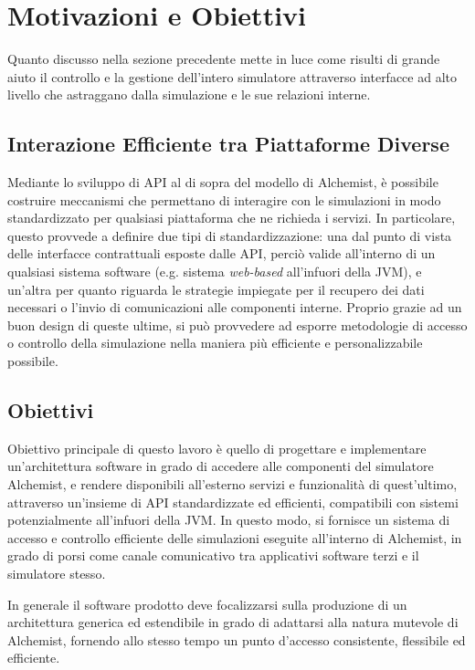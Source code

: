 \section{Motivazioni e Obiettivi}\label{sec:motivations-objectives}
Quanto discusso nella sezione precedente mette in luce come risulti di grande aiuto il controllo e la gestione dell'intero simulatore attraverso interfacce ad alto livello che astraggano dalla simulazione
e le sue relazioni interne.

\subsection{Interazione Efficiente tra Piattaforme Diverse}\label{ssec:platforms-interactions}
Mediante lo sviluppo di API al di sopra del modello di Alchemist, è possibile costruire meccanismi che permettano di interagire con le simulazioni in modo standardizzato per qualsiasi piattaforma che
ne richieda i servizi. In particolare, questo provvede a definire due tipi di standardizzazione: una dal punto di vista delle interfacce contrattuali esposte dalle API, perciò valide all'interno
di un qualsiasi sistema software (e.g. sistema \textit{web-based} all'infuori della \ac{JVM}), e un'altra per quanto riguarda
le strategie impiegate per il recupero dei dati necessari o l'invio di comunicazioni alle componenti interne. Proprio grazie ad un buon design di queste ultime, si può provvedere ad esporre metodologie
di accesso o controllo della simulazione nella maniera più efficiente e personalizzabile possibile.

\subsection{Obiettivi}\label{ssec:objectives}
Obiettivo principale di questo lavoro è quello di progettare e implementare un'architettura software in grado di accedere alle componenti del simulatore Alchemist, e rendere disponibili all'esterno
servizi e funzionalità di quest'ultimo, attraverso un'insieme di API standardizzate ed efficienti, compatibili con sistemi potenzialmente all'infuori della \ac{JVM}. In questo modo, si fornisce un
sistema di accesso e controllo efficiente delle simulazioni eseguite all'interno di Alchemist, in grado di porsi come canale comunicativo tra applicativi software terzi e il simulatore stesso.

In generale il software prodotto deve focalizzarsi sulla produzione di un architettura generica ed estendibile in grado di adattarsi alla natura mutevole di Alchemist, fornendo allo stesso tempo
un punto d'accesso consistente, flessibile ed efficiente.
